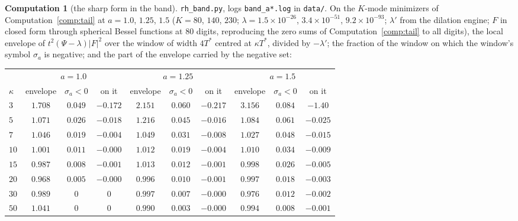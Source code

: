 \documentclass[11pt]{article}
\theoremstyle{definition}
\newtheorem{computation}[theorem]{Computation}
\theoremstyle{remark}
\newcommand{\Tst}{T^{*}}
\begin{document}
\begin{computation}[the sharp form in the band]\label{comp:band}
\texttt{rh\_band.py}, logs \texttt{band\_a*.log} in \texttt{data/}. On the $K$-mode minimizers of Computation~\ref{comp:tail} at $a=1.0$, $1.25$, $1.5$ ($K=80$, $140$, $230$; $\lambda=1.5\times10^{-26}$, $3.4\times10^{-51}$, $9.2\times10^{-93}$; $\lambda'$ from the dilation engine; $F$ in closed form through spherical Bessel functions at $80$ digits, reproducing the zero sums of Computation~\ref{comp:tail} to all digits), the local envelope of $t^2(\Psi-\lambda)|F|^2$ over the window of width $4\Tst$ centred at $\kappa\Tst$, divided by $-\lambda'$; the fraction of the window on which the window's symbol $\sigma_a$ is negative; and the part of the envelope carried by the negative set:
\begin{center}\footnotesize
\begin{tabular}{@{}lccc|ccc|ccc@{}}
\toprule
& \multicolumn{3}{c|}{$a=1.0$} & \multicolumn{3}{c|}{$a=1.25$} & \multicolumn{3}{c}{$a=1.5$}\\
$\kappa$ & envelope & $\sigma_a<0$ & on it & envelope & $\sigma_a<0$ & on it & envelope & $\sigma_a<0$ & on it\\
\midrule
$3$ & $1.708$ & $0.049$ & $-0.172$ & $2.151$ & $0.060$ & $-0.217$ & $3.156$ & $0.084$ & $-1.40$\\
$5$ & $1.071$ & $0.026$ & $-0.018$ & $1.216$ & $0.045$ & $-0.016$ & $1.084$ & $0.061$ & $-0.025$\\
$7$ & $1.046$ & $0.019$ & $-0.004$ & $1.049$ & $0.031$ & $-0.008$ & $1.027$ & $0.048$ & $-0.015$\\
$10$ & $1.001$ & $0.011$ & $-0.000$ & $1.012$ & $0.019$ & $-0.004$ & $1.010$ & $0.034$ & $-0.009$\\
$15$ & $0.987$ & $0.008$ & $-0.001$ & $1.013$ & $0.012$ & $-0.001$ & $0.998$ & $0.026$ & $-0.005$\\
$20$ & $0.968$ & $0.005$ & $-0.000$ & $0.996$ & $0.010$ & $-0.001$ & $0.997$ & $0.018$ & $-0.003$\\
$30$ & $0.989$ & $0$ & $0$ & $0.997$ & $0.007$ & $-0.000$ & $0.976$ & $0.012$ & $-0.002$\\
$50$ & $1.041$ & $0$ & $0$ & $0.990$ & $0.003$ & $-0.000$ & $0.994$ & $0.008$ & $-0.001$\\
\bottomrule
\end{tabular}
\end{center}

\end{computation}
\end{document}
